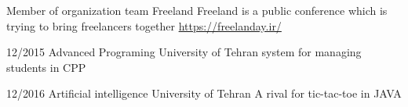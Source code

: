 \documentclass[9pt]{developercv}
\begin{document}

\begin{entrylist}
	\entry
	{}
	{Member of organization team}
	{Freeland}
	{Freeland is a public conference which is trying to bring freelancers together
			{{\href{https://freelanday.ir/}{https://freelanday.ir/}}}
	}
\end{entrylist}




\begin{entrylist}
	\entry
	{12/2015}
	{Advanced Programing}
	{University of Tehran}
	{system for managing students in CPP}
\end{entrylist}
\begin{entrylist}
	\entry
	{12/2016}
	{Artificial intelligence}
	{University of Tehran}
	{A rival for tic-tac-toe in JAVA}
\end{entrylist}
\end{document}

